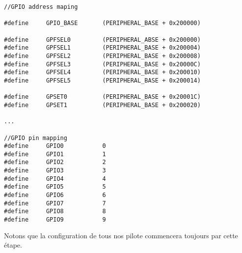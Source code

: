\documentclass[12pt,a4paper,oneside]{book}
\begin{document}
\begin{lstlisting}
//GPIO address maping

#define     GPIO_BASE       (PERIPHERAL_BASE + 0x200000)

#define     GPFSEL0         (PERIPHERAL_ABSE + 0x200000)
#define     GPFSEL1         (PERIPHERAL_BASE + 0x200004)
#define     GPFSEL2         (PERIPHERAL_BASE + 0x200008)
#define     GPFSEL3         (PERIPHERAL_BASE + 0x20000C)
#define     GPFSEL4         (PERIPHERAL_BASE + 0x200010)
#define     GPFSEL5         (PERIPHERAL_BASE + 0x200014)

#define     GPSET0          (PERIPHERAL_BASE + 0x20001C)
#define     GPSET1          (PERIPHERAL_BASE + 0x200020) 

...

//GPIO pin mapping
#define     GPIO0           0
#define     GPIO1           1
#define     GPIO2           2
#define     GPIO3           3
#define     GPIO4           4
#define     GPIO5           5
#define     GPIO6           6
#define     GPIO7           7
#define     GPIO8           8
#define     GPIO9           9

\end{lstlisting}

Notons que la configuration de tous nos pilote commencera toujours par cette étape.\\
\end{document}
